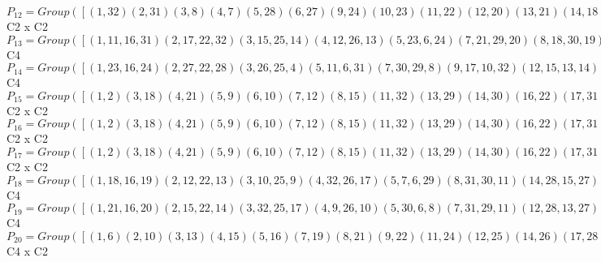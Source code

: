 \documentclass[varwidth=\maxdimen,border=10]{standalone}
\begin{document}
\begin{tabular}
$P_{12} = Group( [ ( 1,32)( 2,31)( 3, 8)( 4, 7)( 5,28)( 6,27)( 9,24)(10,23)(11,22)(12,20)(13,21)(14,18)(15,19)(16,17)(25,30)(26,29), ( 1, 5)( 2, 9)( 3,12)( 4,14)( 6,16)( 7,18)( 8,20)(10,22)(11,23)(13,25)(15,26)(17,27)(19,29)(21,30)(24,31)(28,32) ] )\cong$ C2 x C2\ \\
$P_{13} = Group( [ ( 1,11,16,31)( 2,17,22,32)( 3,15,25,14)( 4,12,26,13)( 5,23, 6,24)( 7,21,29,20)( 8,18,30,19)( 9,27,10,28), ( 1,16)( 2,22)( 3,25)( 4,26)( 5, 6)( 7,29)( 8,30)( 9,10)(11,31)(12,13)(14,15)(17,32)(18,19)(20,21)(23,24)(27,28) ] )\cong$ C4\ \\
$P_{14} = Group( [ ( 1,23,16,24)( 2,27,22,28)( 3,26,25, 4)( 5,11, 6,31)( 7,30,29, 8)( 9,17,10,32)(12,15,13,14)(18,21,19,20), ( 1,16)( 2,22)( 3,25)( 4,26)( 5, 6)( 7,29)( 8,30)( 9,10)(11,31)(12,13)(14,15)(17,32)(18,19)(20,21)(23,24)(27,28) ] )\cong$ C4\ \\
$P_{15} = Group( [ ( 1, 2)( 3,18)( 4,21)( 5, 9)( 6,10)( 7,12)( 8,15)(11,32)(13,29)(14,30)(16,22)(17,31)(19,25)(20,26)(23,28)(24,27), ( 1, 5)( 2, 9)( 3,12)( 4,14)( 6,16)( 7,18)( 8,20)(10,22)(11,23)(13,25)(15,26)(17,27)(19,29)(21,30)(24,31)(28,32) ] )\cong$ C2 x C2\ \\
$P_{16} = Group( [ ( 1, 2)( 3,18)( 4,21)( 5, 9)( 6,10)( 7,12)( 8,15)(11,32)(13,29)(14,30)(16,22)(17,31)(19,25)(20,26)(23,28)(24,27), ( 1, 6)( 2,10)( 3,13)( 4,15)( 5,16)( 7,19)( 8,21)( 9,22)(11,24)(12,25)(14,26)(17,28)(18,29)(20,30)(23,31)(27,32) ] )\cong$ C2 x C2\ \\
$P_{17} = Group( [ ( 1, 2)( 3,18)( 4,21)( 5, 9)( 6,10)( 7,12)( 8,15)(11,32)(13,29)(14,30)(16,22)(17,31)(19,25)(20,26)(23,28)(24,27), ( 1,16)( 2,22)( 3,25)( 4,26)( 5, 6)( 7,29)( 8,30)( 9,10)(11,31)(12,13)(14,15)(17,32)(18,19)(20,21)(23,24)(27,28) ] )\cong$ C2 x C2\ \\
$P_{18} = Group( [ ( 1,18,16,19)( 2,12,22,13)( 3,10,25, 9)( 4,32,26,17)( 5, 7, 6,29)( 8,31,30,11)(14,28,15,27)(20,24,21,23), ( 1,16)( 2,22)( 3,25)( 4,26)( 5, 6)( 7,29)( 8,30)( 9,10)(11,31)(12,13)(14,15)(17,32)(18,19)(20,21)(23,24)(27,28) ] )\cong$ C4\ \\
$P_{19} = Group( [ ( 1,21,16,20)( 2,15,22,14)( 3,32,25,17)( 4, 9,26,10)( 5,30, 6, 8)( 7,31,29,11)(12,28,13,27)(18,24,19,23), ( 1,16)( 2,22)( 3,25)( 4,26)( 5, 6)( 7,29)( 8,30)( 9,10)(11,31)(12,13)(14,15)(17,32)(18,19)(20,21)(23,24)(27,28) ] )\cong$ C4\ \\
$P_{20} = Group( [ ( 1, 6)( 2,10)( 3,13)( 4,15)( 5,16)( 7,19)( 8,21)( 9,22)(11,24)(12,25)(14,26)(17,28)(18,29)(20,30)(23,31)(27,32), ( 1, 5)( 2, 9)( 3,12)( 4,14)( 6,16)( 7,18)( 8,20)(10,22)(11,23)(13,25)(15,26)(17,27)(19,29)(21,30)(24,31)(28,32), ( 1,18,16,19)( 2,12,22,13)( 3,10,25, 9)( 4,32,26,17)( 5, 7, 6,29)( 8,31,30,11)(14,28,15,27)(20,24,21,23) ] )\cong$ C4 x C2\ \\

\end{tabular}
\end{document}

